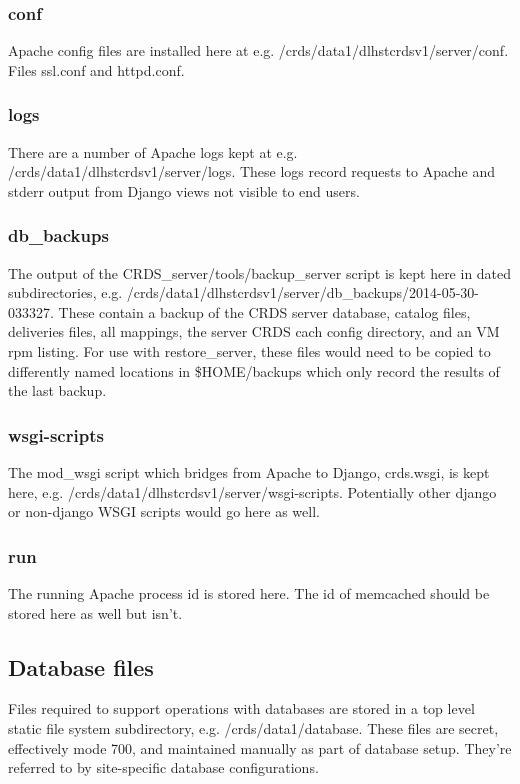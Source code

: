 \documentclass[letterpaper,10pt,english]{sphinxmanual}
\begin{document}
\subsubsection{conf}
\label{server_guide:conf}
Apache config files are installed here at e.g. /crds/data1/dlhstcrdsv1/server/conf.  Files ssl.conf and httpd.conf.


\subsubsection{logs}
\label{server_guide:logs}
There are a number of Apache logs kept at e.g. /crds/data1/dlhstcrdsv1/server/logs.  These logs record requests to
Apache and stderr output from Django views not visible to end users.


\subsubsection{db\_backups}
\label{server_guide:db-backups}
The output of the CRDS\_server/tools/backup\_server script is kept here in dated subdirectories,
e.g. /crds/data1/dlhstcrdsv1/server/db\_backups/2014-05-30-033327.  These contain a backup of the CRDS server database,
catalog files, deliveries files, all mappings, the server CRDS cach config directory, and an VM rpm listing.
For use with restore\_server,  these files would need to be copied to differently named locations in \$HOME/backups
which only record the results of the last backup.


\subsubsection{wsgi-scripts}
\label{server_guide:wsgi-scripts}
The mod\_wsgi script which bridges from Apache to Django,  crds.wsgi,  is kept here,
e.g. /crds/data1/dlhstcrdsv1/server/wsgi-scripts.  Potentially other django or non-django WSGI scripts
would go here as well.


\subsubsection{run}
\label{server_guide:run}
The running Apache process id is stored here.   The id of memcached should be stored here as well but isn't.


\subsection{Database files}
\label{server_guide:database-files}
Files required to support operations with databases are stored in a top level static file system
subdirectory,  e.g. /crds/data1/database.   These files are secret,  effectively mode 700, and maintained
manually as part of database setup.  They're referred to by site-specific database configurations.
\end{document}
